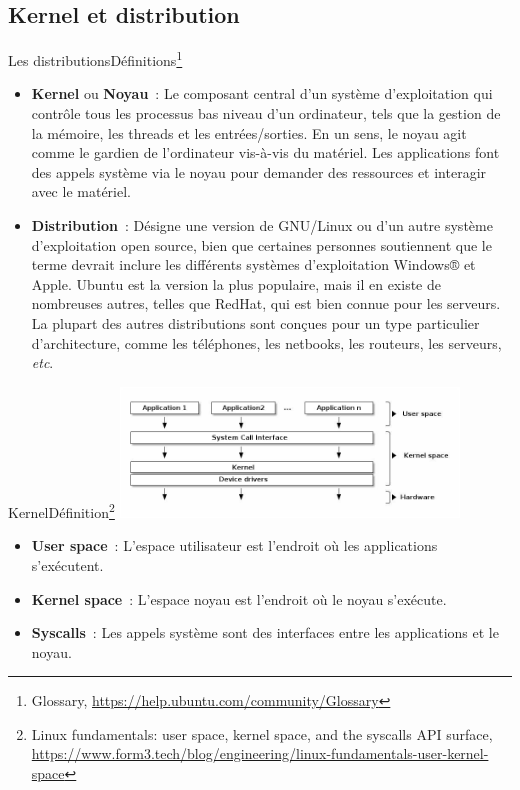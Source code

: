 \documentclass{beamer}
\begin{document}
    \subsection{Kernel et distribution}\label{subsec:kernel-et-distribution}

    \begin{frame}{Les distributions}{Définitions\footnote{Glossary, \url{https://help.ubuntu.com/community/Glossary}}}
        \begin{small}
            \begin{itemize}
                \item \textbf{Kernel} ou \textbf{Noyau}~: Le composant central d'un système d'exploitation qui contrôle tous les processus bas niveau d'un ordinateur, tels que la gestion de la mémoire, les threads et les entrées/sorties.
                En un sens, le noyau agit comme le gardien de l'ordinateur vis-à-vis du matériel.
                Les applications font des appels système via le noyau pour demander des ressources et interagir avec le matériel.
                \item \textbf{Distribution}~: Désigne une version de GNU/Linux ou d'un autre système d'exploitation open source, bien que certaines personnes soutiennent que le terme devrait inclure les différents systèmes d'exploitation Windows® et Apple.
                Ubuntu est la version la plus populaire, mais il en existe de nombreuses autres, telles que RedHat, qui est bien connue pour les serveurs.
                La plupart des autres distributions sont conçues pour un type particulier d'architecture, comme les téléphones, les netbooks, les routeurs, les serveurs, \textit{etc}.
            \end{itemize}
        \end{small}
    \end{frame}

    \begin{frame}{Kernel}{Définition\footnote{Linux fundamentals: user space, kernel space, and the syscalls API surface, \url{https://www.form3.tech/blog/engineering/linux-fundamentals-user-kernel-space}}}
        \centering
        \includegraphics[width=9cm]{image/kernel}
        \flushleft
        \begin{itemize}
            \item \textbf{User space}~: L'espace utilisateur est l'endroit où les applications s'exécutent.
            \item \textbf{Kernel space}~: L'espace noyau est l'endroit où le noyau s'exécute.
            \item \textbf{Syscalls}~: Les appels système sont des interfaces entre les applications et le noyau.
        \end{itemize}
    \end{frame}
\end{document}
